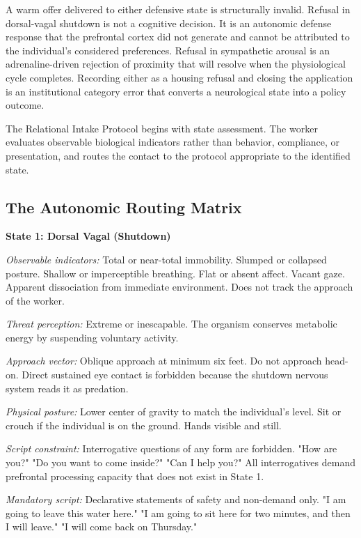 \documentclass[12pt, letterpaper]{article}
\begin{document}
A warm offer delivered to either defensive state is structurally invalid. Refusal in dorsal-vagal shutdown is not a cognitive decision. It is an autonomic defense response that the prefrontal cortex did not generate and cannot be attributed to the individual's considered preferences. Refusal in sympathetic arousal is an adrenaline-driven rejection of proximity that will resolve when the physiological cycle completes. Recording either as a housing refusal and closing the application is an institutional category error that converts a neurological state into a policy outcome.

The Relational Intake Protocol begins with state assessment. The worker evaluates observable biological indicators rather than behavior, compliance, or presentation, and routes the contact to the protocol appropriate to the identified state.

\subsection{The Autonomic Routing Matrix}

\textbf{State 1: Dorsal Vagal (Shutdown)}

\textit{Observable indicators:} Total or near-total immobility. Slumped or collapsed posture. Shallow or imperceptible breathing. Flat or absent affect. Vacant gaze. Apparent dissociation from immediate environment. Does not track the approach of the worker.

\textit{Threat perception:} Extreme or inescapable. The organism conserves metabolic energy by suspending voluntary activity.

\textit{Approach vector:} Oblique approach at minimum six feet. Do not approach head-on. Direct sustained eye contact is forbidden because the shutdown nervous system reads it as predation.

\textit{Physical posture:} Lower center of gravity to match the individual's level. Sit or crouch if the individual is on the ground. Hands visible and still.

\textit{Script constraint:} Interrogative questions of any form are forbidden. "How are you?" "Do you want to come inside?" "Can I help you?" All interrogatives demand prefrontal processing capacity that does not exist in State 1.

\textit{Mandatory script:} Declarative statements of safety and non-demand only. "I am going to leave this water here." "I am going to sit here for two minutes, and then I will leave." "I will come back on Thursday."
\end{document}
